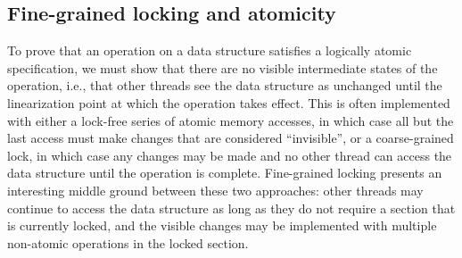 \documentclass[acmsmall,screen]{acmart}\settopmatter{printfolios=true}
\begin{document}

\subsection{Fine-grained locking and atomicity}
\label{atomicity}

To prove that an operation on a data structure satisfies a logically atomic specification, we must show that there are no visible intermediate states of the operation, i.e., that other threads see the data structure as unchanged until the linearization point at which the operation takes effect. This is often implemented with either a lock-free series of atomic memory accesses, in which case all but the last access must make changes that are considered ``invisible'', or a coarse-grained lock, in which case any changes may be made and no other thread can access the data structure until the operation is complete. Fine-grained locking presents an interesting middle ground between these two approaches: other threads may continue to access the data structure as long as they do not require a section that is currently locked, and the visible changes may be implemented with multiple non-atomic operations in the locked section.
\end{document}
